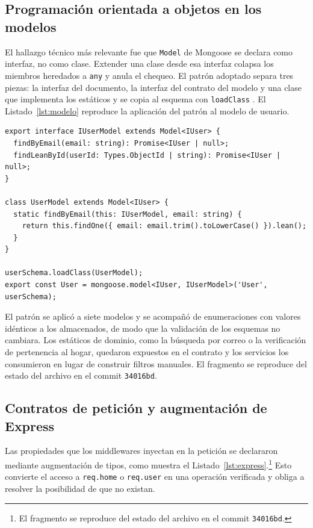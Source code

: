 \documentclass[conference]{IEEEtran}
\begin{document}
\subsection{Programación orientada a objetos en los modelos}
El hallazgo técnico más relevante fue que \texttt{Model} de Mongoose se declara
como interfaz, no como clase. Extender una clase desde esa interfaz colapsa los
miembros heredados a \texttt{any} y anula el chequeo. El patrón adoptado separa
tres piezas: la interfaz del documento, la interfaz del contrato del modelo y
una clase que implementa los estáticos y se copia al esquema con
\texttt{loadClass} \cite{mongoose-model}. El Listado~\ref{lst:modelo} reproduce
la aplicación del patrón al modelo de usuario.

\begin{lstlisting}[caption={Contrato de modelo y estáticos copiados con \texttt{loadClass}},
label={lst:modelo}]
export interface IUserModel extends Model<IUser> {
  findByEmail(email: string): Promise<IUser | null>;
  findLeanById(userId: Types.ObjectId | string): Promise<IUser | null>;
}

class UserModel extends Model<IUser> {
  static findByEmail(this: IUserModel, email: string) {
    return this.findOne({ email: email.trim().toLowerCase() }).lean();
  }
}

userSchema.loadClass(UserModel);
export const User = mongoose.model<IUser, IUserModel>('User', userSchema);
\end{lstlisting}

El patrón se aplicó a siete modelos y se acompañó de enumeraciones con valores
idénticos a los almacenados, de modo que la validación de los esquemas no
cambiara. Los estáticos de dominio, como la búsqueda por correo o la
verificación de pertenencia al hogar, quedaron expuestos en el contrato y los
servicios los consumieron en lugar de construir filtros manuales. El fragmento
se reproduce del estado del archivo en el commit \texttt{34016bd}.

\subsection{Contratos de petición y augmentación de Express}
Las propiedades que los middlewares inyectan en la petición se declararon
mediante augmentación de tipos, como muestra el
Listado~\ref{lst:express}.\footnote{El fragmento se reproduce del estado del
archivo en el commit \texttt{34016bd}.} Esto convierte el acceso a
\texttt{req.home} o \texttt{req.user} en una operación verificada y obliga a
resolver la posibilidad de que no existan.
\end{document}
